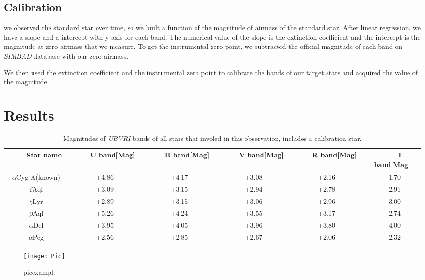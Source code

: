\documentclass[]{article}
\begin{document}
\subsection*{Calibration}
we observed the standard star over time, so we built a function of the magnitude of airmass of the standard star. After linear regression, we have a slope and a intercept with y-axis for each band. The numerical value of the slope is the extinction coefficient and the intercept is the magnitude at zero airmass that we measure. To get the instrumental zero point, we subtracted the official magnitude of each band on \textit{SIMBAD} database with our zero-airmass. 

We then used the extinction coefficient and the instrumental zero point to calibrate the  bands of our target stars and acquired the value of the magnitude. 
 

\section*{Results}

\begin{table}[htbp!]
\begin{center}
\begin{tabular}{c c c c c c}
\hline\hline
\ \ \ \ Star name  \ \ \ \ & \ \ \ \  U band[Mag] \ \ \ \  & \ \ \ \  B band[Mag] \ \ \ \ \  & \ \ \ \ V band[Mag] \ \ \ \ & \ \ \ \ R band[Mag] \ \ \ \ & \ \ \ \ I band[Mag] \\[0.5ex]
\hline
$\alpha$Cyg A(known) & +4.86 & +4.17 & +3.08 & +2.16 & +1.70 \\
$\zeta$Aql & +3.09 & +3.15 & +2.94 & +2.78 & +2.91 \\
$\gamma$Lyr & +2.89 & +3.15 & +3.06 & +2.96 & +3.00 \\
$\beta$Aql & +5.26 & +4.24 & +3.55 & +3.17 & +2.74 \\
$\alpha$Del & +3.95 & +4.05 & +3.96 & +3.80 & +4.00 \\
$\alpha$Peg & +2.56 & +2.85 & +2.67 & +2.06 & +2.32 \\

\hline
\end{tabular}
\caption{Magnitudes of \textit{UBVRI} bands of all stars that involed in this observation, includes a calibration star.}
\label{table:MagResult}
\end{center}
\end{table}



\begin{figure*}[htbp!]
\begin{center}
\texttt{[image: Pic]}
\caption{picexampl.}
\label{fig:Bestfigure}
\end{center}
\end{figure*}
\end{document}
